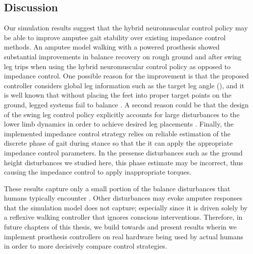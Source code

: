 \subsection{Discussion}\label{sec:completed_comparison_discuss}

Our simulation results suggest that the hybrid neuromuscular control policy may
be able to improve amputee gait stability over existing impedance control
methods. An amputee model walking with a powered prosthesis showed substantial
improvements in balance recovery on rough ground and after swing leg trips when
using the hybrid neuromuscular control policy as opposed to impedance control.
One possible reason for the improvement is that the proposed controller
considers global leg information such as the target leg angle
(), and it is well known that without placing
the feet into proper target points on the ground, legged systems fail to balance
\citep{townsend1985biped,raibert1986legged,kajita20013d,
seyfarth2002movement,pratt2006capture,wu20133}. A second reason could be that
the design of the swing leg control policy explicitly accounts for large
disturbances to the lower limb dynamics in order to achieve desired leg
placements \citep{desai2012robust}. Finally, the implemented impedance control
strategy relies on reliable estimation of the discrete phase of gait during
stance so that the it can apply the appropriate impedance control parameters. In
the presense disturbances such as the ground height disturbances we studied
here, this phase estimate may be incorrect, thus causing the impedance control
to apply inappropriate torques.  

These results capture only a small portion of the balance disturbances that
humans typically encounter \citep{robinovitch2013video}. Other disturbances may
evoke amputee responses that the simulation model does not capture; especially
since it is driven solely by a reflexive walking controller that ignores
conscious interventions. Therefore, in future chapters of this thesis, we build
towards and present results wherin we implement prosthesis controllers on real
hardware being used by actual humans in order to more decisively compare control
strategies.
